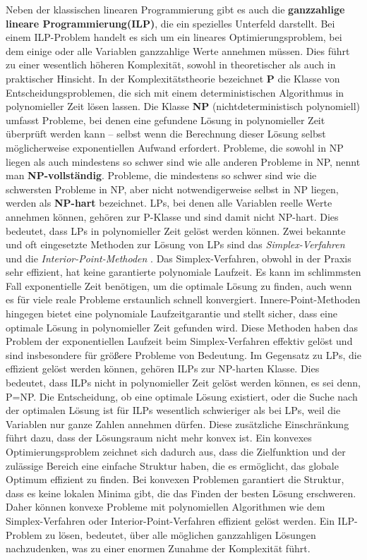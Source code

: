 \documentclass[bachelor, german]{algothesis}
\begin{document}
Neben der klassischen linearen Programmierung gibt es auch die \textbf{ganzzahlige lineare Programmierung(ILP)}, die ein spezielles Unterfeld darstellt. Bei einem ILP-Problem handelt es sich um ein lineares Optimierungsproblem, bei dem einige oder alle Variablen ganzzahlige Werte annehmen müssen. Dies führt zu einer wesentlich höheren Komplexität, sowohl in theoretischer als auch in praktischer Hinsicht.\newline
In der Komplexitätstheorie bezeichnet \textbf{P}  die Klasse von Entscheidungsproblemen, die sich mit einem deterministischen Algorithmus in polynomieller Zeit lösen lassen. Die Klasse \textbf{NP} (nichtdeterministisch polynomiell) umfasst Probleme, bei denen eine gefundene Lösung in polynomieller Zeit überprüft werden kann – selbst wenn die Berechnung dieser Lösung selbst möglicherweise exponentiellen Aufwand erfordert. Probleme, die sowohl in NP liegen als auch mindestens so schwer sind wie alle anderen Probleme in NP, nennt man \textbf{NP-vollständig}. Probleme, die mindestens so schwer sind wie die schwersten Probleme in NP, aber nicht notwendigerweise selbst in NP liegen, werden als \textbf{NP-hart} bezeichnet. LPs, bei denen alle Variablen reelle Werte annehmen können, gehören zur P-Klasse und sind damit nicht NP-hart. Dies bedeutet, dass LPs in polynomieller Zeit gelöst werden können. Zwei bekannte und oft eingesetzte Methoden zur Lösung von LPs sind das \emph{Simplex-Verfahren} und die \emph{Interior-Point-Methoden} \cite{LinearProg}.  Das Simplex-Verfahren, obwohl in der Praxis sehr effizient, hat keine garantierte polynomiale Laufzeit. Es kann im schlimmsten Fall exponentielle Zeit benötigen, um die optimale Lösung zu finden, auch wenn es für viele reale Probleme erstaunlich schnell konvergiert. Innere-Point-Methoden hingegen bietet eine polynomiale Laufzeitgarantie und stellt sicher, dass eine optimale Lösung in polynomieller Zeit gefunden wird. Diese Methoden haben das Problem der exponentiellen Laufzeit beim Simplex-Verfahren effektiv gelöst und sind insbesondere für größere Probleme von Bedeutung.\newline
Im Gegensatz zu LPs, die effizient gelöst werden können, gehören ILPs zur NP-harten Klasse. Dies bedeutet, dass ILPs nicht in polynomieller Zeit gelöst werden können, es sei denn, P=NP. Die Entscheidung, ob eine optimale Lösung existiert, oder die Suche nach der optimalen Lösung ist für ILPs wesentlich schwieriger als bei LPs, weil die Variablen nur ganze Zahlen annehmen dürfen. Diese zusätzliche Einschränkung führt dazu, dass der Lösungsraum nicht mehr konvex ist. Ein konvexes Optimierungsproblem zeichnet sich dadurch aus, dass die Zielfunktion und der zulässige Bereich eine einfache Struktur haben, die es ermöglicht, das globale Optimum effizient zu finden. Bei konvexen Problemen garantiert die Struktur, dass es keine lokalen Minima gibt, die das Finden der besten Lösung erschweren. Daher können konvexe Probleme mit polynomiellen Algorithmen wie dem Simplex-Verfahren oder Interior-Point-Verfahren effizient gelöst werden. Ein ILP-Problem zu lösen, bedeutet, über alle möglichen ganzzahligen Lösungen nachzudenken, was zu einer enormen Zunahme der Komplexität führt.\newline
\end{document}
